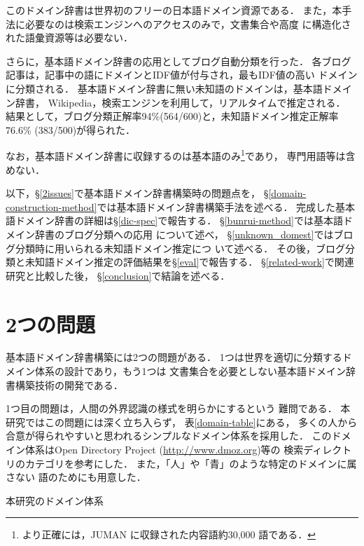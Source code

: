 \documentclass[japanese]{jnlp_1.4}
\newcommand{\dom}[1]{}
\begin{document}
このドメイン辞書は世界初のフリーの日本語ドメイン資源である．
また，本手法に必要なのは検索エンジンへのアクセスのみで，文書集合や高度
に構造化された語彙資源等は必要ない．

さらに，基本語ドメイン辞書の応用としてブログ自動分類を行った．
各ブログ記事は，記事中の語にドメインとIDF値が付与され，最もIDF値の高い
ドメインに分類される．
基本語ドメイン辞書に無い未知語のドメインは，基本語ドメイン辞書，
Wikipedia，検索エンジンを利用して，リアルタイムで推定される．
結果として，ブログ分類正解率94\%(564/600)と，未知語ドメイン推定正解率
76.6\% (383/500)が得られた．

なお，基本語ドメイン辞書に収録するのは基本語のみ\footnote{
より正確には，JUMAN \cite{JumanManual:2005}に収録された内容語約30,000
語である．
}であり，
専門用語等は含めない．

以下，\S\ref{2issues}で基本語ドメイン辞書構築時の問題点を，
\S\ref{domain-construction-method}では基本語ドメイン辞書構築手法を述べる．
完成した基本語ドメイン辞書の詳細は\S\ref{dic-spec}で報告する．
\S\ref{bunrui-method}では基本語ドメイン辞書のブログ分類への応用
について述べ，
\S\ref{unknown_domest}ではブログ分類時に用いられる未知語ドメイン推定につ
いて述べる．
その後，ブログ分類と未知語ドメイン推定の評価結果を\S\ref{eval}で報告する．
\S\ref{related-work}で関連研究と比較した後，
\S\ref{conclusion}で結論を述べる．



\section{2つの問題 \label{2issues}}

基本語ドメイン辞書構築には2つの問題がある．
1つは世界を適切に分類するドメイン体系の設計であり，もう1つは
文書集合を必要としない基本語ドメイン辞書構築技術の開発である．

1つ目の問題は，人間の外界認識の様式を明らかにするという
難問である．
本研究ではこの問題には深く立ち入らず，
表\ref{domain-table}にある，
多くの人から合意が得られやすいと思われるシンプルなドメイン体系を採用した．
このドメイン体系はOpen Directory Project (\url{http://www.dmoz.org})等の
検索ディレクトリのカテゴリを参考にした．
また，「人」や「青」のような特定のドメインに属さない
語のために\dom{ドメイン無し}も用意した．


\begin{table}[b]
\caption{本研究のドメイン体系}
\label{domain-table}
\begin{center}

\end{center}
\end{table}
\end{document}
